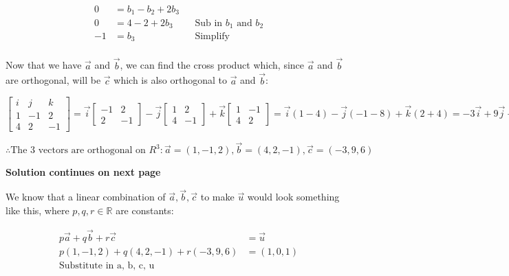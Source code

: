 \documentclass[12pt]{book}
\begin{document}
\begin{enumerate}
 \addtolength{\jot}{0.3em}
 \begin{align*}
  0 &= b_1 - b_2 + 2b_3 \\
  0 &= 4 - 2 + 2b_3 && \text{Sub in } b_1 \text{ and } b_2\\
  -1 &= b_3 && \text{Simplify} \\
 \end{align*}

 Now that we have $\vec{a}$ and $\vec{b}$, we can find the cross product which, 
 since $\vec{a}$ and $\vec{b}$ are orthogonal, will be $\vec{c}$ which is also orthogonal 
 to $\vec{a}$ and $\vec{b}$:

\vspace{0.5cm}

 $
 \begin{bmatrix}
  i & j & k \\  1 & -1 & 2 \\ 4 & 2 & -1
\end{bmatrix}
= \vec{i}
\begin{bmatrix}
  -1 & 2 \\ 2 & -1
\end{bmatrix}
 - \vec{j}
 \begin{bmatrix}
  1 & 2 \\ 4 & -1
\end{bmatrix}
 + \vec{k}
 \begin{bmatrix}
  1 & -1 \\ 4 & 2
\end{bmatrix}
= \vec{i}(1-4) - \vec{j}(-1-8) + \vec{k}(2+4)
= -3\vec{i} + 9\vec{j} + 6\vec{k}
$

\vspace{0.5cm}

\begin{center}
  $\boxed{\therefore \text{The 3 vectors are orthogonal on } R^3: \vec{a} = (1, -1, 2), \vec{b} = (4, 2, -1), \vec{c} = (-3, 9, 6)}$
  \vspace{1cm}

  \textbf{Solution continues on next page}

\end{center}

\newpage

We know that a linear combination of $\vec{a}, \vec{b}, \vec{c}$ to make $\vec{u}$ would 
look something like this, where $p, q, r \in \mathbb{R}$ are constants:

\begin{align*}
 p\vec{a} + q\vec{b} + r\vec{c} &= \vec{u} \\
 p(1, -1, 2) + q(4, 2, -1) + r(-3, 9, 6) &= (1, 0, 1) \\ \text{Substitute in a, b, c, u}\\
\end{align*}


\end{enumerate}
\end{document}

